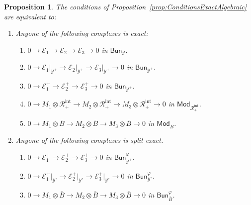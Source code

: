 \documentclass[11pt]{article}
\newtheorem{prop}[theo]{Proposition}
\theoremstyle{definition}
\numberwithin{equation}{section}
\numberwithin{figure}{section}
\numberwithin{table}{section}
\newcommand{\Mod}{\mathsf{Mod}}
\newcommand{\Bun}{\mathsf{Bun}}
\begin{document}
\begin{prop}\label{prop:ConditionsExactnessAdic}
The conditions of Proposition~\ref{prop:ConditionsExactAlgebraic} are equivalent to:
\begin{enumerate}
\item \label{1} Anyone of the following complexes is exact:
\begin{enumerate}
\item \label{1a}
$0\rightarrow\mathscr{E}_{1}\rightarrow\mathscr{E}_{2}\rightarrow\mathscr{E}_{3}\rightarrow0$ in $\Bun_{\mathscr{Y}}$.
\item \label{1b} $0\rightarrow\mathscr{E}_{1}\vert_{\mathscr{Y}^{+}}\rightarrow\mathscr{E}_{2}\vert_{\mathscr{Y}^{+}}\rightarrow\mathscr{E}_{3}\vert_{\mathscr{Y}^{+}}\rightarrow0$ in $\Bun_{\mathscr{Y}^{+}}$.
\item \label{1c} $0\rightarrow\mathscr{E}_{1}^{+}\rightarrow\mathscr{E}_{2}^{+}\rightarrow\mathscr{E}_{3}^{+}\rightarrow0$ in $\Bun_{\mathscr{Y}^{+}}$.
\item \label{1d} $0\rightarrow M_{1}\otimes\mathscr{R}_{+}^{\mathrm{int}}\rightarrow M_{2}\otimes\mathscr{R}_{+}^{\mathrm{int}}\rightarrow M_{3}\otimes\mathscr{R}_{+}^{\mathrm{int}}\rightarrow0$ in $\Mod_{\mathscr{R}_{+}^{\mathrm{int}}}$.
\item \label{1e} $0\rightarrow M_{1}\otimes\overline{B}\rightarrow M_{2}\otimes\overline{B}\rightarrow M_{3}\otimes\overline{B}\rightarrow0$ in $\Mod_{\overline{B}}$.
\end{enumerate}
\item \label{2} Anyone of the following complexes is split exact.
\begin{enumerate}
\item \label{2a} $0\rightarrow\mathscr{E}_{1}^{+}\rightarrow\mathscr{E}_{2}^{+}\rightarrow\mathscr{E}_{3}^{+}\rightarrow0$ in $\Bun_{\mathscr{Y}^{+}}^{\varphi}$.
\item \label{2b} $0\rightarrow\mathscr{E}_{1}^{+}\vert_{\mathscr{Y}^{\circ}}\rightarrow\mathscr{E}_{2}^{+}\vert_{\mathscr{Y}^{\circ}}\rightarrow\mathscr{E}_{3}^{+}\vert_{\mathscr{Y}^{\circ}}\rightarrow0$ in $\Bun_{\mathscr{Y}^{\circ}}^{\varphi}$.
\item \label{2c} $0\rightarrow M_{1}\otimes\overline{B}\rightarrow M_{2}\otimes\overline{B}\rightarrow M_{3}\otimes\overline{B}\rightarrow0$ in $\Bun_{\overline{B}}^{\varphi}$.
\end{enumerate}
\end{enumerate}
\end{prop}
\end{document}
